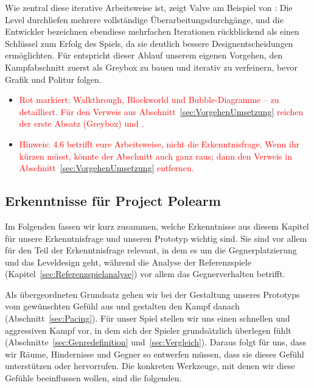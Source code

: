 \documentclass[../Main.tex]{subfiles}
\begin{document}
Wie zentral diese iterative Arbeitsweise ist, zeigt Valve am Beispiel von \autocite{valve_halflife2_2004}: Die Level durchliefen mehrere vollständige Überarbeitungsdurchgänge, und die Entwickler bezeichnen ebendiese mehrfachen Iterationen rückblickend als einen Schlüssel zum Erfolg des Spiels, da sie deutlich bessere Designentscheidungen ermöglichten.\autocite{jacobson2005postmortem} Für  entspricht dieser Ablauf unserem eigenen Vorgehen, den Kampfabschnitt zuerst als Greybox zu bauen und iterativ zu verfeinern, bevor Grafik und Politur folgen.

\begin{itemize}[leftmargin=1.5cm]
    \item \textcolor{red}{Rot markiert: Walkthrough, Blockworld und Bubble-Diagramme -- zu detailliert. Für den Verweis aus Abschnitt~\ref{sec:VorgehenUmsetzung} reichen der erste Absatz (Greybox) und .}
    \item \textcolor{red}{Hinweis: 4.6 betrifft eure Arbeitsweise, nicht die Erkenntnisfrage. Wenn ihr kürzen müsst, könnte der Abschnitt auch ganz raus; dann den Verweis in Abschnitt~\ref{sec:VorgehenUmsetzung} entfernen.}
\end{itemize}

\subsection{Erkenntnisse für Project Polearm} \label{sec:ZwischenfazitLD}

Im Folgenden fassen wir kurz zusammen, welche Erkenntnisse aus diesem Kapitel für unsere Erkenntnisfrage und unseren Prototyp wichtig sind. Sie sind vor allem für den Teil der Erkenntnisfrage relevant, in dem es um die Gegnerplatzierung und das Leveldesign geht, während die Analyse der Referenzspiele (Kapitel~\ref{sec:Referenzspielanalyse}) vor allem das Gegnerverhalten betrifft.

Als übergeordneten Grundsatz gehen wir bei der Gestaltung unseres Prototyps vom gewünschten Gefühl aus und gestalten den Kampf danach (Abschnitt~\ref{sec:Pacing}). Für unser Spiel stellen wir uns einen schnellen und aggressiven Kampf vor, in dem sich der Spieler grundsätzlich überlegen fühlt (Abschnitte~\ref{sec:Genredefinition} und~\ref{sec:Vergleich}). Daraus folgt für uns, dass wir Räume, Hindernisse und Gegner so entwerfen müssen, dass sie dieses Gefühl unterstützen oder hervorrufen. Die konkreten Werkzeuge, mit denen wir diese Gefühle beeinflussen wollen, sind die folgenden.
\end{document}
